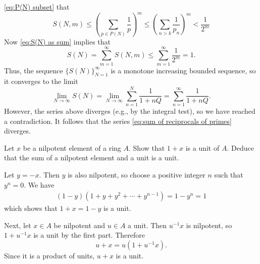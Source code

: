 \documentclass[boxes]{homework}
\begin{document}
\begin{solution}
	\eqref{eq:P(N) subset} that
	\begin{equation*}
		S(N, m)
		\leq \left(\sum_{p \in P(N)} \frac{1}{p}\right)^{m}
		\leq \left(\sum_{n > k} \frac{1}{p_n}\right)^{m}
		< \frac{1}{2^m}
	\end{equation*}
	Now \eqref{eq:S(N) as sum} implies that
	\begin{equation*}
		S(N)
		= \sum_{m=1}^\infty S(N, m)
		\leq \sum_{m=1}^\infty \frac{1}{2^m} = 1.
	\end{equation*}
	Thus, the sequence $\{S(N)\}_{N=1}^\infty$ is a monotone increasing bounded
	sequence, so it converges to the limit
	\begin{equation*}
		\lim_{N \to \infty} S(N)
		= \lim_{N \to \infty} \sum_{n=1}^N \frac{1}{1 + n Q}
		= \sum_{n=1}^\infty \frac{1}{1 + n Q}.
	\end{equation*}
	However, the series above diverges (e.g., by the integral test), so we have
	reached a contradiction.
	It follows that the series \eqref{eq:sum of reciprocals of primes} diverges.
\end{solution}

\begin{problem}
Let $x$ be a nilpotent element of a ring $A$.
Show that $1 + x$ is a unit of $A$.
Deduce that the sum of a nilpotent element and a unit is a unit.
\end{problem}

\begin{solution}
	Let $y = -x$.
	Then $y$ is also nilpotent, so choose a positive integer $n$ such that
	$y^n = 0$.
	We have
	\begin{align*}
		(1 - y) (1 + y + y^2 + \cdots + y^{n-1})
		= 1 - y^n
		= 1
	\end{align*}
	which shows that $1 + x = 1 - y$ is a unit.

	Next, let $x\in A$ be nilpotent and $u\in A$ a unit.
	Then $u^{-1} x$ is nilpotent, so $1 + u^{-1}x$ is a unit by the first part.
	Therefore
	\begin{equation*}
		u + x = u(1 + u^{-1} x).
	\end{equation*}
	Since it is a product of units, $u + x$ is a unit.
\end{solution}
\end{document}
